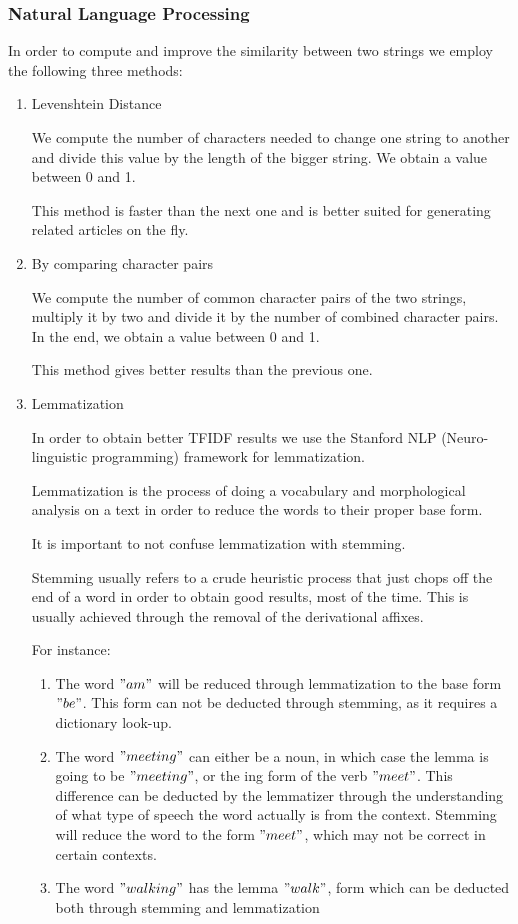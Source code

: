\subsubsection{Natural Language Processing}
\label{sec:natural-language-processing}
In order to compute and improve the similarity between two strings we employ the following three methods:
\begin{enumerate}
	\item Levenshtein Distance

		We compute the number of characters needed to change one string to another and divide this value by the length of the bigger string. We obtain a value between 0 and 1.
		
		This method is faster than the next one and is better suited for generating related articles on the fly.

	\item By comparing character pairs
	
		We compute the number of common character pairs of the two strings, multiply it by two and divide it by the number of combined character pairs. In the end, we obtain a value between 0 and 1.
		
		This method gives better results than the previous one.
	\item Lemmatization
		
		In order to obtain better TFIDF results we use the Stanford NLP (Neuro-linguistic programming) framework for lemmatization.

		Lemmatization is the process of doing a vocabulary and morphological analysis on a text in order to reduce the words to their proper base form.

		It is important to not confuse lemmatization with stemming.

		Stemming usually refers to a crude heuristic process that just chops off the end of a word in order to obtain good results, most of the time. This is usually achieved through the removal of the derivational affixes.

		For instance:
		\begin{enumerate}
			\item The word $"am"$ will be reduced through lemmatization to the base form $"be"$. This form can not be deducted through stemming, as it requires a dictionary look-up.
			\item The word $"meeting"$ can either be a noun, in which case the lemma is going to be $"meeting"$, or the ing form of the verb $"meet"$. This difference can be deducted by the lemmatizer through the understanding of what type of speech the word actually is from the context. Stemming will reduce the word to the form $"meet"$, which may not be correct in certain contexts.
			\item The word $"walking"$ has the lemma $"walk"$, form which can be deducted both through stemming and lemmatization

		\end{enumerate}

\end{enumerate}

